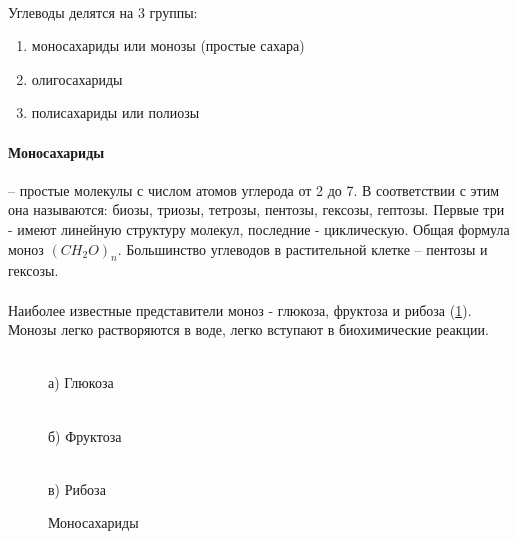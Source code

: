 \paragraph*{}Углеводы делятся на 3 группы:

\begin{enumerate}

	\item моносахариды или монозы (простые сахара)
	\item олигосахариды
	\item полисахариды или полиозы

\end{enumerate}

\paragraph*{Моносахариды} -- простые молекулы с числом атомов углерода от 2 до 7. В соответствии с этим она называются: биозы, триозы, тетрозы, пентозы, гексозы, гептозы. Первые три - имеют линейную структуру молекул, последние - циклическую. Общая формула моноз 
$(CH_{2}O)_{n}$. Большинство углеводов в растительной клетке -- пентозы и гексозы.

\paragraph*{}Наиболее известные представители моноз - глюкоза, фруктоза и рибоза (\ris \ref{monogluc}). Монозы легко растворяются в воде, легко вступают в биохимические реакции. 


\begin{figure}[h]
\begin{minipage}[h]{0.3\linewidth}
 \\ а) Глюкоза
\end{minipage}
\hfill
\begin{minipage}[h]{0.3\linewidth}
 \\ б) Фруктоза
\end{minipage}
\begin{minipage}[h]{0.3\linewidth}
 \\ в) Рибоза
\end{minipage}
\caption{Моносахариды}
\label{monogluc}
\end{figure}

